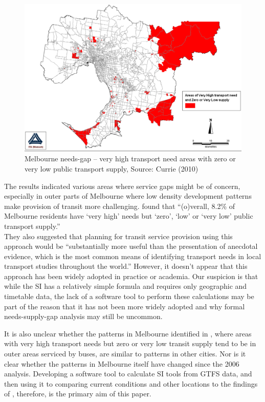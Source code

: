 \documentclass[preprint, 3p,
authoryear]{elsarticle} %
\begin{document}
\begin{figure}
\includegraphics[width=1\linewidth]{graphics/Currie2010gap} \caption{Melbourne needs-gap – very high transport need areas with zero or very low public transport supply, Source: Currie (2010)}\label{fig:Currie_map_gap}
\end{figure}

The results indicated various areas where service gaps might be of
concern, especially in outer parts of Melbourne where low density
development patterns make provision of transit more challenging.
\citet{currie2010identifying} found that ``(o)verall, 8.2\% of Melbourne
residents have `very high' needs but `zero', `low' or `very low' public
transport supply.''\\
They also suggested that planning for transit service provision using
this approach would be ``substantially more useful than the presentation
of anecdotal evidence, which is the most common means of identifying
transport needs in local transport studies throughout the world.''
However, it doesn't appear that this approach has been widely adopted in
practice or academia. Our suspicion is that while the SI has a
relatively simple formula and requires only geographic and timetable
data, the lack of a software tool to perform these calculations may be
part of the reason that it has not been more widely adopted and why
formal needs-supply-gap analysis may still be uncommon.

It is also unclear whether the patterns in Melbourne identified in
\citet{currie2010identifying}, where areas with very high transport
needs but zero or very low transit supply tend to be in outer areas
serviced by buses, are similar to patterns in other cities. Nor is it
clear whether the patterns in Melbourne itself have changed since the
2006 analysis. Developing a software tool to calculate SI tools from
GTFS data, and then using it to comparing current conditions and other
locations to the findings of \citet{currie2010identifying}, therefore,
is the primary aim of this paper.
\end{document}
